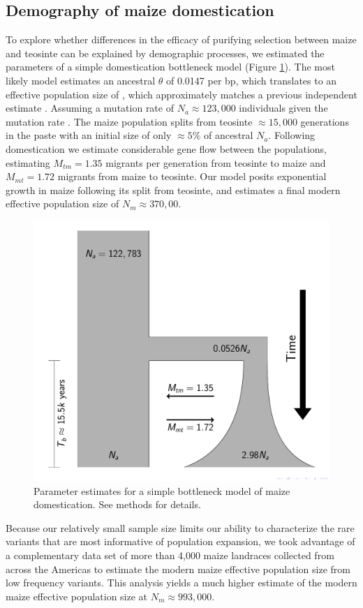 \documentclass{pnastwo}
\begin{document}
\begin{article}
\subsection{Demography of maize domestication}
To explore whether differences in the efficacy of purifying selection between maize and teosinte can be explained by demographic processes, we estimated the parameters of a simple domestication bottleneck model  (Figure \ref{fig:bottleneck}). 
The most likely model estimates an ancestral $\theta$ of 0.0147 per bp, which translates to an effective population size of , which approximately matches a previous independent estimate \cite{eyre1998}. Assuming a mutation rate of $N_a \approx 123,000$ individuals given the mutation rate \cite{clark2005}.
The maize population splits from teosinte $\approx 15,000$ generations in the paste with an initial size of only $\approx 5\%$ of ancestral $N_a$. 
Following domestication we estimate considerable gene flow between the populations, estimating $M_{tm} = 1.35$  migrants per generation from teosinte to maize and $M_{mt} = 1.72$ migrants from maize to teosinte.
Our model posits exponential growth in maize following its split from teosinte, and estimates a final modern effective population size of $N_m \approx 370,00$.

\begin{figure}
\centering
\includegraphics[width=.4\textwidth]{FigsAndFiles/DomesticationModel/domesticationModel.pdf}
\caption{Parameter estimates for a simple bottleneck model of maize domestication. See methods for details. \label{fig:bottleneck} }
\end{figure}

Because our relatively small sample size limits our ability to characterize the rare variants that are most informative of population expansion, we took advantage of a complementary data set of more than 4,000 maize landraces collected from across the Americas \cite{Hearne2015} to estimate the modern maize effective population size from low frequency variants. 
This analysis yields a much higher estimate of the modern maize effective population size at  $N_m \approx 993,000$.


\end{article}
\end{document}
